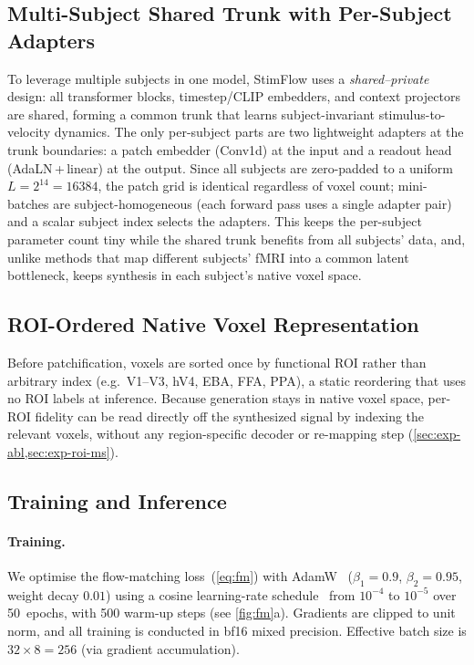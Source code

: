 \documentclass[runningheads]{llncs}
\begin{document}
\subsection{Multi-Subject Shared Trunk with Per-Subject Adapters}
\label{sec:method-ms}

To leverage multiple subjects in one model, StimFlow uses a \emph{shared--private} design: all
transformer blocks, timestep/CLIP embedders, and context projectors are shared, forming a
common trunk that learns subject-invariant stimulus-to-velocity dynamics. The only per-subject
parts are two lightweight adapters at the trunk boundaries: a patch embedder (Conv1d) at the
input and a readout head (AdaLN\,+\,linear) at the output. Since all subjects are zero-padded to
a uniform $L = 2^{14} = 16384$, the patch grid is identical regardless of voxel count;
mini-batches are subject-homogeneous (each forward pass uses a single adapter pair) and a scalar
subject index selects the adapters. This keeps the per-subject parameter count tiny while the
shared trunk benefits from all subjects' data, and, unlike methods that map different subjects'
fMRI into a common latent bottleneck, keeps synthesis in each subject's native voxel space.

\subsection{ROI-Ordered Native Voxel Representation}
\label{sec:method-roi}

Before patchification, voxels are sorted once by functional ROI rather than arbitrary index
(e.g.\ V1--V3, hV4, EBA, FFA, PPA), a static reordering that uses no ROI labels at inference.
Because generation stays in native voxel space, per-ROI fidelity can be read directly off the
synthesized signal by indexing the relevant voxels, without any region-specific decoder or
re-mapping step (\cref{sec:exp-abl,sec:exp-roi-ms}).

\subsection{Training and Inference}
\label{sec:method-train}

\paragraph{Training.}
We optimise the flow-matching loss~(\cref{eq:fm}) with AdamW~\cite{loshchilov2019decoupled}
($\beta_1 = 0.9$, $\beta_2 = 0.95$, weight decay $0.01$) using a cosine learning-rate
schedule~\cite{loshchilov2017sgdr} from $10^{-4}$ to $10^{-5}$ over 50~epochs, with 500 warm-up steps (see \cref{fig:fm}a).
Gradients are clipped to unit norm, and all training is conducted in bf16 mixed
precision.
Effective batch size is $32 \times 8 = 256$ (via gradient accumulation).
\end{document}
